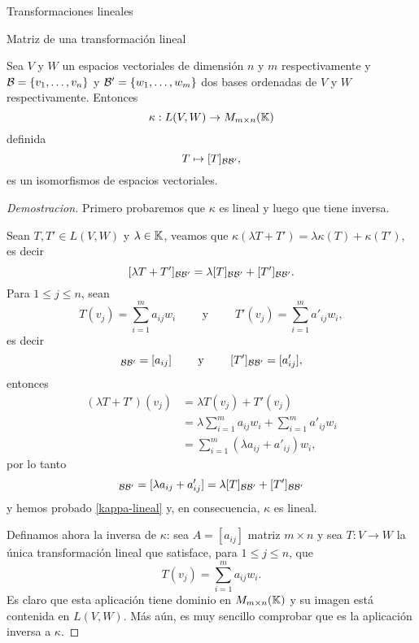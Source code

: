 \begin{chapter}{Transformaciones lineales}
\begin{section}{Matriz de una transformaci\'on lineal}
        \begin{teorema}[*]
            Sea $V$  y $W$ un espacios vectoriales de dimensión $n$ y $m$ respectivamente y $\mathcal{B} = \{v_1,\ldots,v_n\}$ y $\mathcal{B}' = \{w_1,\ldots,w_m\}$ dos bases  ordenadas de $V$ y $W$ respectivamente. Entonces 
            $$
            \kappa: L(V,W) \to M_{m \times n}(\mathbb K)
            $$
            definida
            $$
            T \mapsto [T]_{\mathcal{B} \mathcal{B}'},
            $$
            es un isomorfismos de espacios vectoriales. 
        \end{teorema}
        \begin{proof}[Demostracion]
            Primero probaremos que $\kappa$  es lineal y luego que tiene inversa.
            
            Sean $T,T' \in L(V,W)$ y $\lambda \in \mathbb K$, veamos que $\kappa(\lambda T+ T') = \lambda \kappa(T)+ \kappa(T')$,  es decir
            \begin{equation}\label{kappa-lineal}
                [\lambda T+ T']_{\mathcal{B} \mathcal{B}'} = \lambda[T]_{\mathcal{B} \mathcal{B}'}+ [T']_{\mathcal{B} \mathcal{B}'}.
            \end{equation}
            Para $1 \le j \le n$, sean 
            \begin{equation*}
                T(v_j) = \sum_{i=1}^m a_{ij} w_i\qquad \text{ y } \qquad T'(v_j) = \sum_{i=1}^m a'_{ij} w_i,
            \end{equation*}
            es  decir
            \begin{equation*}
            [T]_{\cB \cB'} =	[a_{ij}] \qquad\text{ y } \qquad [T']_{\cB \cB'} =	[a'_{ij}],
            \end{equation*}
            entonces
            \begin{align*}
                (\lambda T+ T')(v_j) &= \lambda T(v_j)+ T'(v_j) \\
                &=\lambda \sum_{i=1}^m a_{ij} w_i+ \sum_{i=1}^m a'_{ij} w_i \\
                &= \sum_{i=1}^m (\lambda a_{ij}+ a'_{ij}) w_i,
            \end{align*}
            por lo tanto
            \begin{equation*}
                [\lambda T+ T']_{\cB \cB'} = [\lambda a_{ij}+ a'_{ij}] =
                \lambda[T]_{\cB \cB'}+ [T']_{\cB \cB'}
            \end{equation*}
            y hemos probado \eqref{kappa-lineal} y, en consecuencia, $\kappa$  es lineal.
            
            
            Definamos ahora la inversa de $\kappa$: sea $A = [a_{ij}]$ matriz $m \times n$ y sea $T: V \to W$ la única transformación lineal que satisface, para $1 \le j \le n$, que
            $$
            T(v_j) = \sum_{i=1}^m a_{ij} w_i.
            $$
            Es claro que esta aplicación tiene dominio en $M_{m \times n}(\mathbb K)$ y su imagen está contenida en  $L(V,W)$. Más aún,  es muy sencillo comprobar que es la aplicación inversa a $\kappa$.
            

\end{proof}
\end{section}
\end{chapter}
